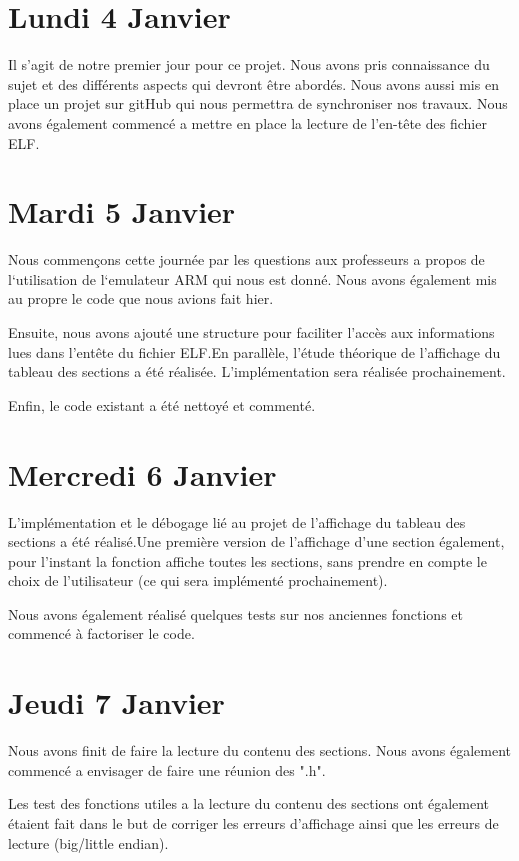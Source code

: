 \documentclass[12pt, a4paper]{article}
\begin{document}
\section{Lundi 4 Janvier}

Il s'agit de notre premier jour pour ce projet. Nous avons pris 
connaissance du sujet et des différents aspects qui devront être 
abordés. Nous avons aussi mis en place un projet sur gitHub qui nous 
permettra de synchroniser nos travaux. Nous avons également 
commencé a mettre en place la lecture de l'en-t\^ete des fichier 
ELF.

\section{Mardi 5 Janvier}

Nous commençons cette journée par les questions aux professeurs a propos de 
l`utilisation de l`emulateur ARM qui nous est donn\'e. Nous avons également 
mis au propre le code que nous avions fait hier.

Ensuite, nous avons ajouté une structure pour faciliter l'accès aux 
informations lues dans l’entête  du fichier ELF.En parallèle, l'étude 
théorique de l'affichage du tableau des sections a été réalisée. 
L'implémentation sera réalisée prochainement.

Enfin, le code existant a été nettoyé et commenté.

\section{Mercredi 6 Janvier}

L'implémentation et le débogage lié au projet de l'affichage du tableau des 
sections a été réalisé.Une première version de l'affichage d'une section 
également, pour l'instant la fonction affiche toutes les sections, sans 
prendre en compte le choix de l'utilisateur (ce qui sera implémenté 
prochainement).

Nous avons également réalisé quelques tests sur nos anciennes fonctions et 
commencé à factoriser le code.

\section{Jeudi 7 Janvier}

Nous avons finit de faire la lecture du contenu des sections. Nous avons 
également commenc\'e a envisager de faire une réunion des ".h". 

Les test des fonctions utiles a la lecture du contenu des sections ont 
également étaient fait dans le but de corriger les erreurs d'affichage ainsi 
que les erreurs de lecture (big/little endian).
\end{document}
